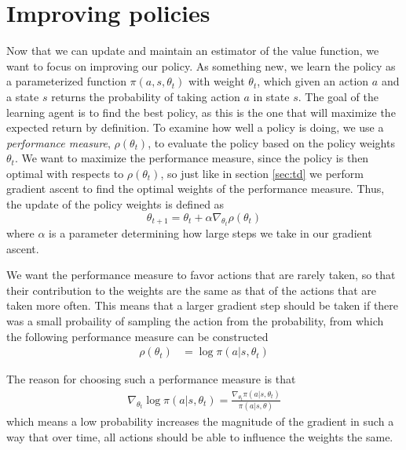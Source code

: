 \documentclass[11pt]{article}
\begin{document}
\section{Improving policies}

Now that we can update and maintain an estimator of the value function, we want
to focus on improving our policy.
As something new, we learn the policy as a parameterized function $\pi(a, s, \theta_t)$
with weight $\theta_t$, which given an action $a$ and a state $s$ returns the probability
of taking action $a$ in state $s$.
The goal of the learning agent is to find the best policy, as this is the one
that will maximize the expected return by definition.
To examine how well a policy is doing, we use a \textit{performance measure}, $\rho(\theta_t)$, to evaluate
the policy based on the policy weights $\theta_t$.
We want to maximize the performance measure, since the policy is then optimal with
respects to $\rho(\theta_t)$, so just like in section \ref{sec:td}
we perform gradient ascent to find the optimal weights of the performance measure.
Thus, the update of the policy weights is defined as
\begin{equation}
    \theta_{t+1} = \theta_t + \alpha \nabla_{\theta_t} \rho(\theta_t)
\end{equation}
where $\alpha$ is a parameter determining how large steps we take in our gradient ascent.

We want the performance measure to favor actions that are rarely taken, so that
their contribution to the weights are the same as that of the actions that are
taken more often.
This means that a larger gradient step should be taken if there was a small probaility
of sampling the action from the probability, from which the following performance
measure can be constructed
\begin{equation}
    \begin{aligned}
        \rho(\theta_t) & = \log\pi(a|s, \theta_t)
    \end{aligned}
\end{equation}

The reason for choosing such a performance measure is that
\begin{equation}\label{per_mes}
    \begin{aligned}
        \nabla_{\theta_t} \log\pi(a|s, \theta_t) = \frac{\nabla_{\theta_t}\pi(a|s, \theta_t)}{\pi(a|s,\theta)}
    \end{aligned}
\end{equation}
which means a low probability increases the magnitude of the gradient
in such a way that over time, all actions should be able to influence the
weights the same.
\end{document}
